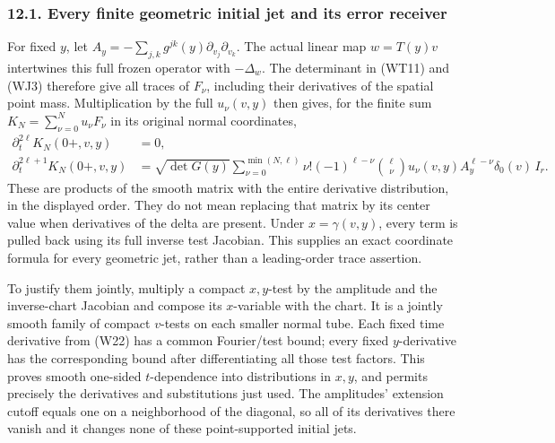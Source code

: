 \documentclass[
  11pt,
]{article}
\begin{document}
\subsubsection{12.1. Every finite geometric initial jet and its error
receiver}\label{every-finite-geometric-initial-jet-and-its-error-receiver}

For fixed \(y\), let
\(A_y=-\sum_{j,k}g^{jk}(y)\partial_{v_j}\partial_{v_k}\). The actual
linear map \(w=T(y)v\) intertwines this full frozen operator with
\(-\Delta_w\). The determinant in (WT11) and (WJ3) therefore give all
traces of \(F_\nu\), including their derivatives of the spatial point
mass. Multiplication by the full \(u_\nu(v,y)\) then gives, for the
finite sum \(K_N=\sum_{\nu=0}^Nu_\nu F_\nu\) in its original normal
coordinates, \[
\begin{split}
 \partial_t^{2\ell}K_N(0+,v,y)&=0,\\
 \partial_t^{2\ell+1}K_N(0+,v,y)
   &=\sqrt{\det G(y)}
       \sum_{\nu=0}^{\min(N,\ell)}
           \nu!(-1)^{\ell-\nu}\binom{\ell}{\nu}
              u_\nu(v,y)A_y^{\ell-\nu}\delta_0(v)\,I_r .
\end{split}
 \tag{WJ4}
\] These are products of the smooth matrix with the entire derivative
distribution, in the displayed order. They do not mean replacing that
matrix by its center value when derivatives of the delta are present.
Under \(x=\gamma(v,y)\), every term is pulled back using its full
inverse test Jacobian. This supplies an exact coordinate formula for
every geometric jet, rather than a leading-order trace assertion.

To justify them jointly, multiply a compact \(x,y\)-test by the
amplitude and the inverse-chart Jacobian and compose its \(x\)-variable
with the chart. It is a jointly smooth family of compact \(v\)-tests on
each smaller normal tube. Each fixed time derivative from (W22) has a
common Fourier/test bound; every fixed \(y\)-derivative has the
corresponding bound after differentiating all those test factors. This
proves smooth one-sided \(t\)-dependence into distributions in \(x,y\),
and permits precisely the derivatives and substitutions just used. The
amplitudes' extension cutoff equals one on a neighborhood of the
diagonal, so all of its derivatives there vanish and it changes none of
these point-supported initial jets.
\end{document}
